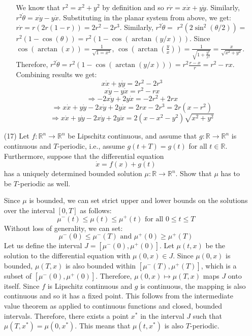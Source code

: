 \documentclass[12pt,letterpaper,reqno]{amsart}
\newcommand{\R}{\mathbb R}
\begin{document}
\begin{enumerate}
\begin{enumerate}
    \begin{flushleft}
    We know that $r^2 = x^2 + y^2$ by definition and so $r\dot{r} = x\dot{x} + y\dot{y}$. Similarly, $r^2\dot{\theta} = x\dot{y} - y\dot{x}$. Substituting in the planar system from above, we get: $r\dot{r} = r(2r(1-r)) = 2r^2 - 2r^3$. Similarly, $r^2\dot{\theta} =$ $ r^2(2\sin^2(\theta/2)) =$ $r^2(1-\cos(\theta)) = r^2(1- \cos(\arctan(y/x)))$. Since $\cos(\arctan(x)) = \frac{1}{\sqrt{1 = x^2}}$, $\cos(\arctan(\frac{y}{x})) = \frac{1}{\sqrt{1 + \frac{y^2}{x^2}}} = \frac{x}{\sqrt{x^2 + y^2}}$. Therefore, $r^2\dot{\theta} = r^2(1- \cos(\arctan(y/x))) = r^2 \frac{r-x}{r} = r^2 - rx$. Combining results we get:
    $$ x\dot{x} + y\dot{y} =  2r^2 - 2r^3$$
    $$ x\dot{y} - y\dot{x} =  r^2 - rx$$
    $$ \Rightarrow -2x\dot{y} + 2y\dot{x} = -2r^2 + 2rx$$
    $$ \Rightarrow x\dot{x} + y\dot{y} - 2x\dot{y} + 2y\dot{x} = 2rx - 2r^3 = 2r(x-r^2)$$
    $$ \Rightarrow x\dot{x} + y\dot{y} - 2x\dot{y} + 2y\dot{x} = 2(x-x^2-y^2)\sqrt{x^2 + y^2}$$
    \end{flushleft}
\end{enumerate}
\newpage
\item[(17)] Let $f:\R^n\rightarrow\R^n$ be Lipschitz continuous, and assume that $g: \R\rightarrow\R^n$ is continuous and $T$-periodic, i.e., assume $g(t+T) = g(t)$ for all $t \in \R$. Furthermore, suppose that the differential equation
$$\dot{x} = f(x) + g(t)$$
has a uniquely determined bounded solution $\mu: \R \rightarrow \R^n$. Show that $\mu$ has to be $T$-periodic as well.
\newline
\begin{flushleft}
    Since $\mu$ is bounded, we can set strict upper and lower bounds on the solutions over the interval $[0,T]$ as follows:
    $$\mu^-(t) \leq \mu(t) \leq \mu^+(t) \text{ for all } 0 \leq t \leq T$$
    Without loss of generality, we can set:
    $$\mu^-(0) \leq \mu^-(T) \text{ and } \mu^+(0) \geq \mu^+(T)$$
    Let us define the interval $J = [\mu^-(0),\mu^+(0)]$. Let $\mu(t,x)$ be the solution to the differential equation with $\mu(0,x) \in J$. Since $\mu(0,x)$ is bounded, $\mu(T,x)$ is also bounded within $[\mu^-(T),\mu^+(T)]$, which is a subset of $[\mu^-(0),\mu^+(0)]$. Therefore, $\mu(0,x) \mapsto \mu(T,x)$ maps $J$ onto itself. Since $f$ is Lipschitz continuous and $g$ is continuous, the mapping is also continuous and so it has a fixed point. This follows from the intermediate value theorem as applied to continuous functions and closed, bounded intervals. Therefore, there exists a point $x^*$ in the interval $J$ such that $\mu(T,x^*) = \mu(0,x^*)$. This means that $\mu(t,x^*)$ is also $T$-periodic.
\end{flushleft}
\end{enumerate}
\end{document}
